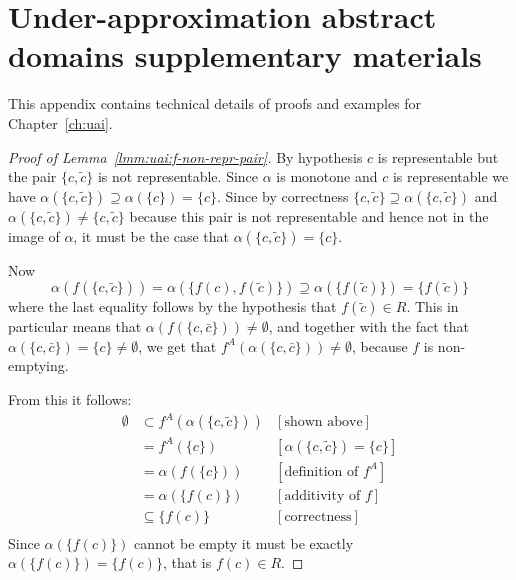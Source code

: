 
\chapter{Under-approximation abstract domains supplementary materials}\label{ch:app:uai}
This appendix contains technical details of proofs and examples for Chapter~\ref{ch:uai}.

\begin{proof}[Proof of Lemma~\ref{lmm:uai:f-non-repr-pair}]
	By hypothesis $c$ is representable but the pair $\{ c, \tilde{c} \}$ is not representable.
	Since $\alpha$ is monotone and $c$ is representable we have $\alpha(\{ c, \tilde{c} \}) \supseteq \alpha(\{ c \}) = \{ c \}$.
	Since by correctness $\{ c, \tilde{c} \} \supseteq \alpha(\{ c, \tilde{c} \})$ and $\alpha(\{ c, \tilde{c} \}) \neq \{ c, \tilde{c} \}$ because this pair is not representable and hence not in the image of $\alpha$, it must be the case that $\alpha(\{ c, \tilde{c} \}) = \{ c \}$.

	Now
	\begin{equation*}
		\alpha(f(\{ c, \tilde{c} \})) = \alpha(\{ f(c), f(\tilde{c}) \}) \supseteq \alpha(\{ f(\tilde{c}) \}) = \{ f(\tilde{c}) \}
	\end{equation*}
	where the last equality follows by the hypothesis that $f(\tilde{c}) \in R$.
	This in particular means that $\alpha(f(\{ c, \bar{c} \})) \neq \emptyset$, and together with the fact that $\alpha(\{ c, \bar{c} \}) = \{ c \} \neq \emptyset$, we get that $f^{A}(\alpha(\{ c, \bar{c} \})) \neq \emptyset$, because $f$ is non-emptying.

	From this it follows:
	\begin{align*}
		\emptyset & \subset f^{A}(\alpha(\{ c, \tilde{c} \})) & [\text{shown above}]                   \\
		          & = f^{A}(\{ c \})                          & [\alpha(\{ c, \tilde{c} \}) = \{ c \}] \\
		          & = \alpha(f(\{ c \}))                      & [\text{definition of } f^{A}]          \\
		          & = \alpha(\{ f(c) \})                      & [\text{additivity of } f]              \\
		          & \subseteq \{ f(c)\}                       & [\text{correctness}]                   \\
	\end{align*}
	Since $\alpha(\{ f(c) \})$ cannot be empty it must be exactly $\alpha(\{ f(c) \}) = \{ f(c) \}$, that is $f(c) \in R$.
\end{proof}

